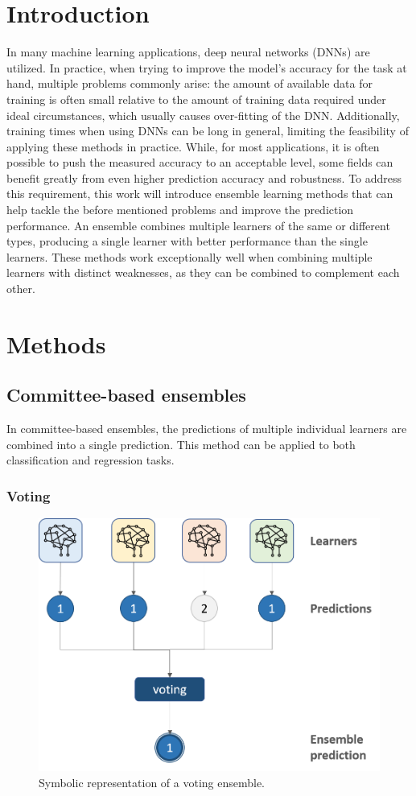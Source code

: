 \section{Introduction}
In many machine learning applications, deep neural networks (DNNs) are utilized. In practice, when trying to improve the model's accuracy for the task at hand, multiple problems commonly arise: the amount of available data for training is often small relative to the amount of training data required under ideal circumstances, which usually causes over-fitting of the DNN. Additionally, training times when using DNNs can be long in general, limiting the feasibility of applying these methods in practice.
While, for most applications, it is often possible to push the measured accuracy to an acceptable level, some fields can benefit greatly from even higher prediction accuracy and robustness. To address this requirement, this work will introduce ensemble learning methods that can help tackle the before mentioned problems and improve the prediction performance. An ensemble combines multiple learners of the same or different types, producing a single learner with better performance than the single learners. These methods work exceptionally well when combining multiple learners with distinct weaknesses, as they can be combined to complement each other. \citep{Opitz.1999}


\section{Methods}

\subsection{Committee-based ensembles} \label{Committee}
In committee-based ensembles, the predictions of multiple individual learners are combined into a single prediction. This method can be applied to both classification and regression tasks.

\subsubsection{Voting}

\begin{figure}[htbp]
    \centering
    \includegraphics[width=.7\textwidth]{figures/voting}
    \caption{Symbolic representation of a voting ensemble.}
    \label{fig:voting}
\end{figure}

